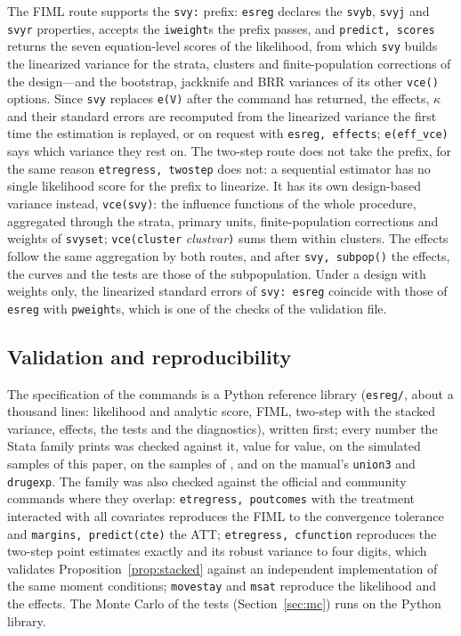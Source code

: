 \documentclass[11pt,a4paper]{article}
\theoremstyle{plain}
\theoremstyle{definition}
\theoremstyle{remark}
\newcommand{\1}{\mathbf{1}}
\newcommand{\cmd}[1]{\texttt{#1}}
\begin{document}
The FIML route supports the \cmd{svy:} prefix: \cmd{esreg} declares the
\cmd{svyb}, \cmd{svyj} and \cmd{svyr} properties, accepts the
\cmd{iweight}s the prefix passes, and \cmd{predict, scores} returns
the seven equation-level scores of the likelihood, from which
\cmd{svy} builds the linearized variance for the strata, clusters and
finite-population corrections of the design---and the bootstrap,
jackknife and BRR variances of its other \cmd{vce()} options. Since
\cmd{svy} replaces \cmd{e(V)} after the command has returned, the
effects, $\kappa$ and their standard errors are recomputed from the
linearized variance the first time the estimation is replayed, or on
request with \cmd{esreg, effects}; \cmd{e(eff\_vce)} says which
variance they rest on. The two-step route does not take the prefix,
for the same reason \cmd{etregress, twostep} does not: a sequential
estimator has no single likelihood score for the prefix to linearize.
It has its own design-based variance instead, \cmd{vce(svy)}: the
influence functions of the whole procedure, aggregated through the
strata, primary units, finite-population corrections and weights of
\cmd{svyset}; \cmd{vce(cluster} \textit{clustvar}\cmd{)} sums them within
clusters. The effects follow the same aggregation by both routes, and
after \cmd{svy, subpop()} the effects, the curves and the tests are those
of the subpopulation. Under a design with weights only, the linearized
standard errors of \cmd{svy: esreg} coincide with those of \cmd{esreg}
with \cmd{pweight}s, which is one of the checks of the validation file.

\subsection{Validation and reproducibility}\label{sec:cmd:valid}

The specification of the commands is a Python reference library
(\cmd{esreg/}, about a thousand lines: likelihood and analytic score,
FIML, two-step with the stacked variance, effects, the tests and the
diagnostics), written first; every number the Stata family prints was
checked against it, value for value, on the simulated samples of this
paper, on the samples of \citet{araar2026msat}, and on the manual's
\cmd{union3} and \cmd{drugexp}. The family was also checked against the
official and community commands where they overlap: \cmd{etregress,
poutcomes} with the treatment interacted with all covariates
reproduces the FIML to the convergence tolerance and \cmd{margins,
predict(cte)} the ATT; \cmd{etregress, cfunction} reproduces the
two-step point estimates exactly and its robust variance to four
digits, which validates Proposition~\ref{prop:stacked} against an
independent implementation of the same moment conditions;
\cmd{movestay} and \cmd{msat} reproduce the likelihood and the
effects. The Monte Carlo of the tests (Section~\ref{sec:mc}) runs on the
Python library.
\end{document}
